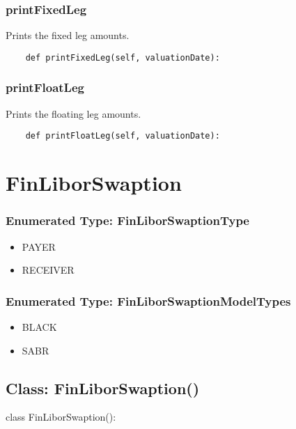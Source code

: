 \documentclass[twoside,11pt]{book}
\begin{document}
\subsubsection*{{\bf printFixedLeg}}
Prints the fixed leg amounts.  

\begin{lstlisting}
    def printFixedLeg(self, valuationDate):
\end{lstlisting}

\subsubsection*{{\bf printFloatLeg}}
Prints the floating leg amounts.  

\begin{lstlisting}
    def printFloatLeg(self, valuationDate):
\end{lstlisting}

\newpage
\section{FinLiborSwaption}

\subsubsection{Enumerated Type: FinLiborSwaptionType}
\begin{itemize}
\item{PAYER}
\item{RECEIVER}
\end{itemize}

\subsubsection{Enumerated Type: FinLiborSwaptionModelTypes}
\begin{itemize}
\item{BLACK}
\item{SABR}
\end{itemize}

\subsection*{Class: FinLiborSwaption()}
class FinLiborSwaption(): 
\end{document}
